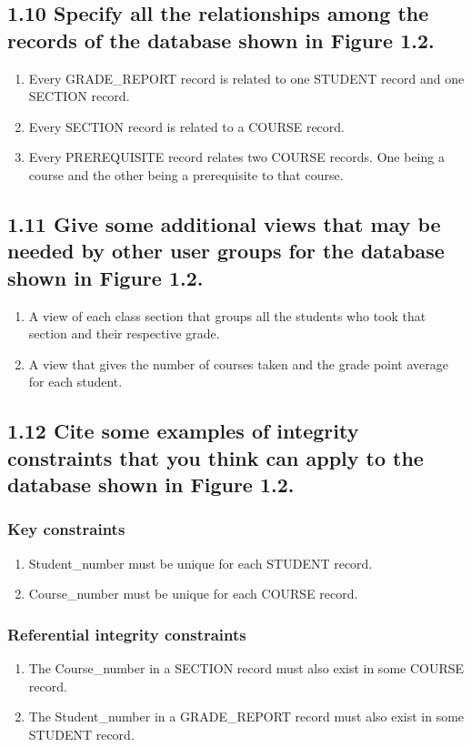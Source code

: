 \documentclass[11pt, oneside]{article}   	%
\begin{document}
\subsection*{1.10 Specify all the relationships among the records of the database shown in Figure 1.2.}

\begin{enumerate}
\item Every GRADE\_REPORT record is related to one STUDENT record and one SECTION record.
\item Every SECTION record is related to a COURSE record.
\item Every PREREQUISITE record relates two COURSE records. One being a course and the other being a prerequisite to that course.
\end{enumerate}

\subsection*{1.11 Give some additional views that may be needed by other user groups for the database shown in Figure 1.2.}

\begin{enumerate}
\item A view of each class section that groups all the students who took that section and their respective grade.
\item A view that gives the number of courses taken and the grade point average for each student.
\end{enumerate}

\subsection*{1.12 Cite some examples of integrity constraints that you think can apply to the database shown in Figure 1.2.}

\subsubsection*{Key constraints}
\begin{enumerate}
\item Student\_number must be unique for each STUDENT record.
\item Course\_number must be unique for each COURSE record.
\end{enumerate}

\subsubsection*{Referential integrity constraints}
\begin{enumerate}
\item The Course\_number in a SECTION record must also exist in some COURSE record.
\item The Student\_number in a GRADE\_REPORT record must also exist in some STUDENT record.
\end{enumerate}
\end{document}
